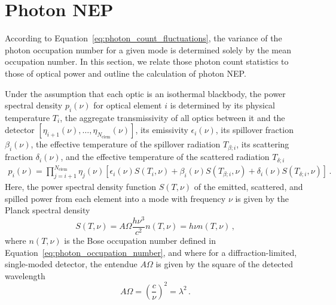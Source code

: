 
\section{Photon NEP}
\label{sec:sensitivity_photon_nep}

According to Equation~\ref{eq:photon_count_fluctuations}, the variance of the photon occupation number for a given mode is determined solely by the mean occupation number. In this section, we relate those photon count statistics to those of optical power and outline the calculation of photon NEP.

Under the assumption that each optic is an isothermal blackbody, the power spectral density $p_{i}(\nu)$ for optical element $i$ is determined by its physical temperature $T_{i}$, the aggregate transmissivity of all optics between it and the detector $\left[ \eta_{i+1} (\nu) , \ldots , \eta_{N_{\mathrm{elem}}} (\nu) \right]$, its emissivity $\epsilon_{i} (\nu)$, its spillover fraction $\beta_{i} (\nu)$, the effective temperature of the spillover radiation $T_{\beta ; i}$, its scattering fraction $\delta_{i} (\nu)$, and the effective temperature of the scattered radiation $T_{\delta ; i}$
\begin{align}
    p_{i} \left( \nu \right) =
    \prod_{j = i + 1}^{N_{\mathrm{elem}}} \eta_{j} (\nu) \left[ \epsilon_{i} (\nu) S(T_{i}, \nu) + \beta_{i}(\nu) S(T_{\beta;i}, \nu) + \delta_{i}(\nu) S(T_{\delta; i}, \nu) \right] \, .
    \label{eq:pow_spec_density}
\end{align}
Here, the power spectral density function $S(T, \nu)$ of the emitted, scattered, and spilled power from each element into a mode with frequency $\nu$ is given by the Planck spectral density
\begin{equation}
    S(T, \nu) = A \Omega \frac{h \nu^{3}}{c^{2}} n(T, \nu) = h \nu n(T, \nu) \, ,
    \label{eq:planck_spectrum}
\end{equation}
where $n(T, \nu)$ is the Bose occupation number defined in Equation~\ref{eq:photon_occupation_number}, and where for a diffraction-limited, single-moded detector, the entendue $A \Omega$ is given by the square of the detected wavelength
\begin{equation}
    A \Omega = \left( \frac{c}{\nu} \right)^{2} = \lambda^{2} \, .
    \label{eq:aomega}
\end{equation}

